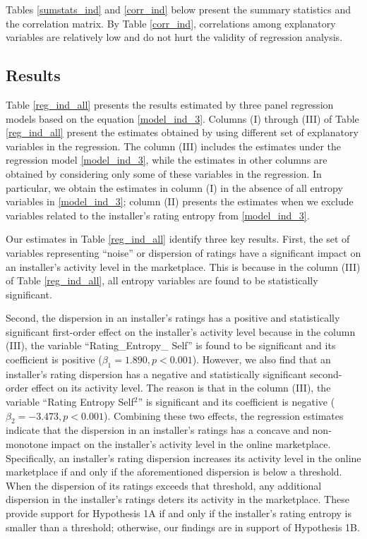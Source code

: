 \documentclass[msom,blindrev]{informs3}
\begin{document}
	Tables \ref{sumstats_ind} and \ref{corr_ind} below present the summary statistics and the correlation matrix. By Table \ref{corr_ind}, correlations among explanatory variables are relatively low and do not hurt the validity of regression analysis.
	
	
	
	
	
	\subsection{Results}
	
	Table \ref{reg_ind_all} presents the results estimated by three panel regression models based on the equation \eqref{model_ind_3}. Columns (I) through (III) of Table \ref{reg_ind_all} present the estimates obtained by using different set of explanatory variables in the regression. The column (III) includes the estimates under the regression model \eqref{model_ind_3}, while the estimates in other columns are obtained by considering only some of these variables in the regression. In particular, we obtain the estimates in column (I) in the absence of all entropy variables in \eqref{model_ind_3}; column (II) presents the estimates when we exclude variables related to the installer's rating entropy from \eqref{model_ind_3}.
	
	
	
	
	Our estimates in Table \ref{reg_ind_all} identify three key results. First, the set of variables representing ``noise'' or dispersion of ratings have a significant impact on an installer's activity level in the marketplace. This is because in the column (III) of Table \ref{reg_ind_all}, all entropy variables are found to be statistically significant.
	
	Second, the dispersion in an installer's ratings has a positive and statistically significant first-order effect on the installer's activity level because in the column (III), the variable ``Rating\_Entropy\_ Self'' is found to be significant and its coefficient is positive ($\beta_{1} = 1.890,p<0.001$). However, we also find that an installer's rating dispersion has a negative and statistically significant second-order effect on its activity level. The reason is that in the column (III), the variable ``Rating Entropy Self$^2$'' is significant and its coefficient is negative ($\beta_{2} = -3.473, p<0.001$). Combining these two effects, the regression estimates indicate that the dispersion in an installer's ratings has a concave and non-monotone impact on the installer's activity level in the online marketplace. Specifically,  an installer's rating dispersion increases its activity level in the online marketplace if and only if the aforementioned dispersion is below a threshold. When the dispersion of its ratings exceeds that threshold, any additional dispersion in the installer's ratings deters its activity in the marketplace. These provide support for Hypothesis 1A if and only if the installer's rating entropy is smaller than a threshold; otherwise, our findings are in support of Hypothesis 1B.
	
\end{document}
